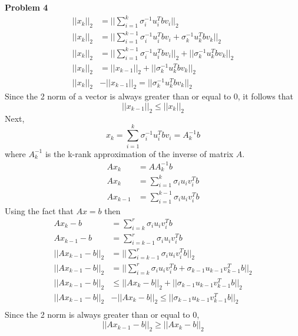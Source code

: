 \documentclass{article} %
\begin{document}
\textbf{Problem 4} \\
\begin{align*}
||x_k||_2  &= ||\sum^k_{i=1} \sigma_i^{-1} u_i^T b v_i ||_2 \\
||x_k||_2  &= ||\sum^{k-1}_{i=1} \sigma_i^{-1} u_i^T b v_i + \sigma_k^{-1} u_k^T b v_k  ||_2\\
||x_k||_2  &= ||\sum^{k-1}_{i=1} \sigma_i^{-1} u_i^T b v_i||_2 + ||\sigma_k^{-1} u_k^T b v_k  ||_2\\
||x_k||_2  &= ||x_{k-1}||_2 + ||\sigma_k^{-1} u_k^T b v_k  ||_2 \\
||x_k||_2 &- ||x_{k-1}||_2 = ||\sigma_k^{-1} u_k^T b v_k  ||_2
\end{align*}
Since the 2 norm of a vector is always greater than or equal to 0, it follows that 
\begin{equation*}
||x_{k-1}||_2 \leq ||x_k||_2
\end{equation*}
Next, 
\begin{equation*}
x_k = \sum_{i=1}^k \sigma_i^{-1} u_i^T b v_i = A^{-1}_k b
\end{equation*}
where $A^{-1}_k$ is the k-rank approximation of the inverse of matrix $A$.
\begin{align*}
A x_k &= A A^{-1}_k b \\
A x_k &= \sum_{i=1}^k \sigma_i u_i v_i^T b \\
A x_{k-1} &= \sum_{i=1}^{k-1} \sigma_i u_i v_i^T b
\end{align*}
Using the fact that $Ax = b$ then
\begin{align*}
A x_k - b &=  \sum_{i=k}^r \sigma_i u_i v_i^T b \\
A x_{k-1} - b&= \sum_{i=k-1}^r \sigma_i u_i v_i^T b \\
||A x_{k-1} - b||_2 &= ||\sum_{i=k-1}^r \sigma_i u_i v_i^T b||_2 \\
||A x_{k-1} - b||_2 &= ||\sum_{i=k}^r \sigma_i u_i v_i^T b + \sigma_{k-1} u_{k-1} v_{k-1}^T b||_2 \\
||A x_{k-1} - b||_2 &\leq ||Ax_k - b||_2 + ||\sigma_{k-1} u_{k-1} v_{k-1}^T b||_2 \\
||A x_{k-1} - b||_2 &- ||Ax_k - b||_2 \leq ||\sigma_{k-1} u_{k-1} v_{k-1}^T b||_2 \\
\end{align*}
Since the 2 norm is always greater than or equal to 0, 
\begin{equation*}
||A x_{k-1} - b||_2 \geq ||Ax_k - b||_2
\end{equation*}
\end{document}
